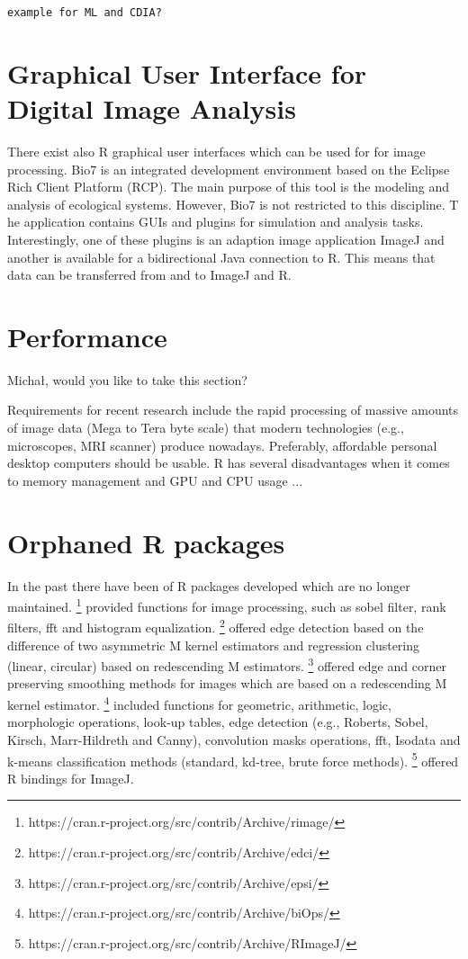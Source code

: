 \texttt{example for ML and CDIA?}

\section{Graphical User Interface for Digital Image Analysis}

There exist also R graphical user interfaces \citep{rodiger_rkward:_2012} which 
can be used for for image processing. Bio7 is an integrated development 
environment based on the Eclipse Rich Client Platform (RCP). The main purpose of 
this tool is the modeling and analysis of ecological systems. However, Bio7 is 
not restricted to this discipline. T he application contains GUIs and plugins 
for simulation and analysis tasks. Interestingly, one of these plugins is an 
adaption image application ImageJ and another is available for a bidirectional 
Java connection to R. This means that data can be transferred from and to ImageJ 
and R.

\section{Performance}

Micha\l{}, would you like to take this section?


Requirements for recent research include the rapid processing of massive amounts 
of image data (Mega to Tera byte scale) that modern technologies (e.g., 
microscopes, MRI scanner) produce nowadays. Preferably, affordable personal desktop
computers should be usable. R has several disadvantages when it comes to memory management
and GPU and CPU usage ...

\section{Orphaned R packages}

In the past there have been of R packages developed which are no longer 
maintained. 
\footnote{https://cran.r-project.org/src/contrib/Archive/rimage/ 
} provided functions for image processing, such as sobel filter, rank filters, 
fft and histogram equalization. 
\footnote{https://cran.r-project.org/src/contrib/Archive/edci/} 
offered edge detection based on the difference of two asymmetric M kernel 
estimators and regression clustering (linear, circular) based on redescending M 
estimators. 
\footnote{https://cran.r-project.org/src/contrib/Archive/epsi/} 
offered edge and corner preserving smoothing methods for images which are based 
on a redescending M kernel estimator. 
\footnote{https://cran.r-project.org/src/contrib/Archive/biOps/} 
included functions for geometric, arithmetic, logic, morphologic operations, 
look-up tables, edge detection (e.g., Roberts, Sobel, Kirsch, Marr-Hildreth and 
Canny), convolution masks operations, fft, Isodata and k-means classification methods 
(standard, kd-tree, brute force methods). \footnote{ 
https://cran.r-project.org/src/contrib/Archive/RImageJ/} offered R bindings for 
ImageJ.

